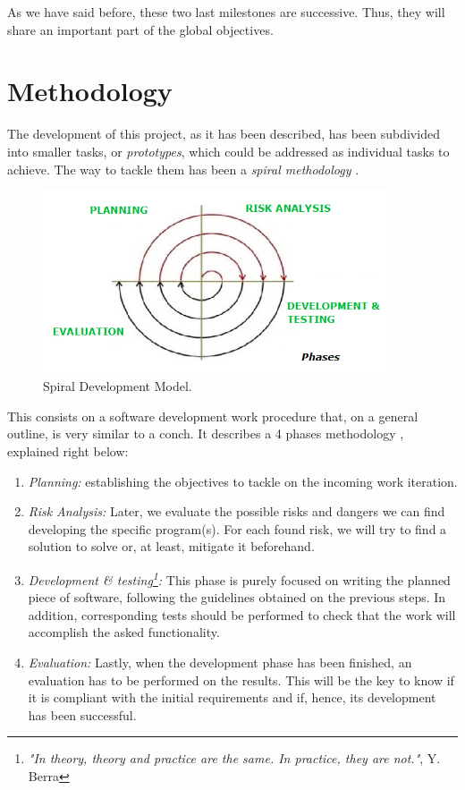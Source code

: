 As we have said before, these two last milestones are successive. Thus, they will share an important part of the global objectives.\\


\section{Methodology}
The development of this project, as it has been described, has been subdivided into smaller tasks, or \emph{prototypes}, which could be addressed as individual tasks to achieve. The way to tackle them has been a \textit{spiral methodology} \cite{boehm-spiral}.\\

\begin{figure}[h]
	\centering
	\includegraphics[width=4in]{images/spiral}
	\caption{Spiral Development Model.}
	\label{fig:2_spiral}
\end{figure}


This consists on a software development work procedure that, on a general outline, is very similar to a conch. It describes a 4 phases methodology \cite{spiral-steps}, explained right below:

\begin{enumerate}
	\item \textit{Planning:} establishing the objectives to tackle on the incoming work iteration.

	\item \textit{Risk Analysis:} Later, we evaluate the possible risks and dangers we can find developing the specific program(s). For each found risk, we will try to find a solution to solve or, at least, mitigate it beforehand.

	\item \textit{Development \& testing\footnote{\textit{"In theory, theory and practice are the same. In practice, they are not."}, Y. Berra}:} This phase is purely focused on writing the planned piece of software, following the guidelines obtained on the previous steps. In addition, corresponding tests should be performed to check that the work will accomplish the asked functionality.
	\item \textit{Evaluation:} Lastly, when the development phase has been finished, an evaluation has to be performed on the results. This will be the key to know if it is compliant with the initial requirements and if, hence, its development has been successful.
\end{enumerate}


